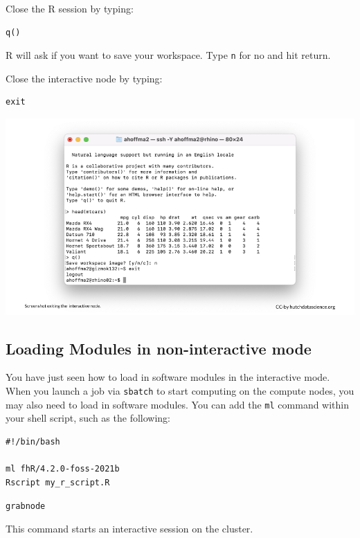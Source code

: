 \documentclass[
]{book}
\begin{document}
Close the R session by typing:

\begin{verbatim}
q()
\end{verbatim}

R will ask if you want to save your workspace. Type \texttt{n} for no and hit return.

Close the interactive node by typing:

\begin{verbatim}
exit
\end{verbatim}

\includegraphics[width=1\linewidth]{resources/images/09-interactive_files/figure-latex//1BQxrVYdKZTbpCaF-i_q9w7s9x034lEXpQZDU-Sl09cs_gff2211b72f_1_82}

\hypertarget{loading-modules-in-non-interactive-mode}{%
\subsection{Loading Modules in non-interactive mode}\label{loading-modules-in-non-interactive-mode}}

You have just seen how to load in software modules in the interactive mode. When you launch a job via \texttt{sbatch} to start computing on the compute nodes, you may also need to load in software modules. You can add the \texttt{ml} command within your shell script, such as the following:

\begin{verbatim}
#!/bin/bash

ml fhR/4.2.0-foss-2021b
Rscript my_r_script.R
\end{verbatim}

\texttt{grabnode}

This command starts an interactive session on the cluster.
\end{document}
